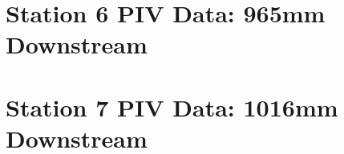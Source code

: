 \section{Station 6 PIV Data: 965mm Downstream}












\section{Station 7 PIV Data: 1016mm Downstream}










